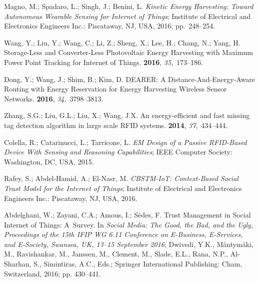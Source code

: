 \documentclass[symmetry,article,accept,moreauthors,pdftex10pt,a4paper]{mdpi}
\begin{document}
\begin{thebibliography}{999}
Magno, M.; Spadaro, L.; Singh, J.; Benini, L.
\newblock \emph{Kinetic Energy Harvesting: Toward Autonomous Wearable Sensing for
	Internet of Things};
\newblock Institute of Electrical and Electronics Engineers Inc.: Piscataway, NJ, USA, 2016; pp.~248--254.

Wang, Y.; Liu, Y.; Wang, C.; Li, Z.; Sheng, X.; Lee, H.; Chang, N.; Yang, H.
\newblock Storage-Less and Converter-Less Photovoltaic Energy Harvesting with
Maximum Power Point Tracking for Internet of Things.
 {\bf 2016}, {\em 35},~173--186.

Dong, Y.; Wang, J.; Shim, B.; Kim, D.
\newblock DEARER: A Distance-And-Energy-Aware Routing with Energy Reservation
for Energy Harvesting Wireless Sensor Networks.
 {\bf 2016},
{\em 34},~3798--3813.

Zhang, S.G.; Liu, G.L.; Liu, X.; Wang, J.X.
\newblock An energy-efficient and fast missing tag detection algorithm in large
scale RFID systems.
 {\bf 2014}, {\em
	37},~434--444.

Colella, R.; Catarinucci, L.; Tarricone, L.
\newblock \emph{EM Design of a Passive RFID-Based Device With Sensing and Reasoning
	Capabilities};
\newblock IEEE Computer Society: Washington, DC, USA, 2015.

Rafey, S.; Abdel-Hamid, A.; El-Nasr, M.
\newblock \emph{CBSTM-IoT: Context-Based Social Trust Model for the Internet of
	Things};
\newblock Institute of Electrical and Electronics Engineers Inc.: Piscataway, NJ, USA, 2016.

Abdelghani, W.; Zayani, C.A.; Amous, I.; S{\`e}des, F. Trust Management in
Social Internet of Things: A~Survey.
\newblock In {\em Social Media: The Good, the Bad, and the Ugly, Proceedings of the 15th IFIP WG
	6.11 Conference on E-Business, E-Services, and E-Society, Swansea,
	UK, 13--15 September 2016}; Dwivedi, Y.K., M{\"a}ntym{\"a}ki,
M., Ravishankar, M., Janssen, M., Clement, M., Slade, E.L., Rana, N.P.,
Al-Sharhan, S., Simintiras, A.C., Eds.; Springer International Publishing:
Cham, Switzerland, 2016; pp. 430--441.


\end{thebibliography}
\end{document}
